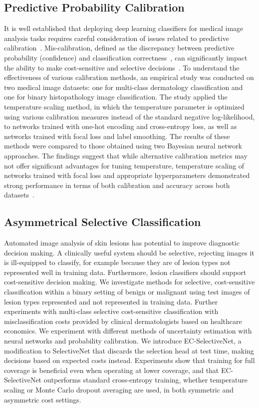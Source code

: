 \subsection*{Predictive Probability Calibration}
It is well established that deploying deep learning classifiers for medical image analysis tasks requires careful consideration of issues related to predictive calibration~\citep{maron2019systematic}. Mis-calibration, defined as the discrepancy between predictive probability (confidence) and classification correctness~\citep{guo2017calibration}, can significantly impact the ability to make cost-sensitive and selective decisions~\citep{carse2021robust}. To understand the effectiveness of various calibration methods, an empirical study was conducted on two medical image datasets: one for multi-class dermatology classification and one for binary histopathology image classification. The study applied the temperature scaling method, in which the temperature parameter is optimized using various calibration measures instead of the standard negative log-likelihood, to networks trained with one-hot encoding and cross-entropy loss, as well as networks trained with focal loss and label smoothing. The results of these methods were compared to those obtained using two Bayesian neural network approaches. The findings suggest that while alternative calibration metrics may not offer significant advantages for tuning temperature, temperature scaling of networks trained with focal loss and appropriate hyperparameters demonstrated strong performance in terms of both calibration and accuracy across both datasets~\citep{carse2022calibration}.

\subsection*{Asymmetrical Selective Classification}
Automated image analysis of skin lesions has potential to improve diagnostic decision making. A clinically useful system should be selective, rejecting images it is ill-equipped to classify, for example because they are of lesion types not represented well in training data. Furthermore, lesion classifiers should support cost-sensitive decision making. We investigate methods for selective, cost-sensitive classification within a binary setting of benign or malignant using test images of lesion types represented and not represented in training data. Further experiments with multi-class selective cost-sensitive classification with misclassification costs provided by clinical dermatologists based on healthcare economics. We experiment with different methods of uncertainty estimation with neural networks and probability calibration.
We introduce EC-SelectiveNet, a modification to SelectiveNet that discards the selection head at test time, making decisions based on expected costs instead. Experiments show that training for full coverage is beneficial even when operating at lower coverage, and that EC-SelectiveNet outperforms standard cross-entropy training, whether temperature scaling or Monte Carlo dropout averaging are used, in both symmetric and asymmetric cost settings.


